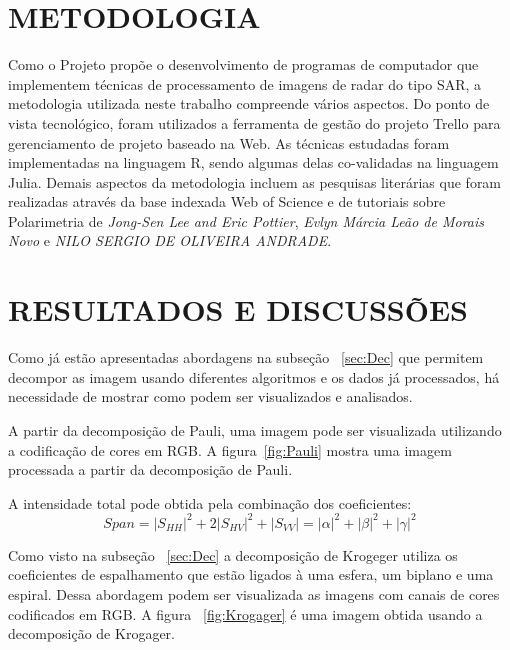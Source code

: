 \documentclass[a4paper,12pt]{article}
\begin{document}

\section{METODOLOGIA}
\label{sec:Met}

Como o Projeto propõe o desenvolvimento de programas de computador que implementem técnicas de processamento de imagens de radar do tipo SAR, a  metodologia utilizada neste trabalho compreende vários aspectos. Do ponto de vista tecnológico, foram utilizados a ferramenta de gestão do projeto Trello para gerenciamento de projeto baseado na Web. As técnicas estudadas foram implementadas na linguagem R, sendo algumas delas co-validadas na linguagem Julia.
Demais aspectos da metodologia incluem as pesquisas literárias que foram realizadas através da base indexada Web of Science e de tutoriais sobre Polarimetria de \emph{Jong-Sen Lee and Eric Pottier}, \emph{Evlyn Márcia Leão de Morais Novo} e \emph{NILO SERGIO DE OLIVEIRA ANDRADE}. 

\newpage
\section{RESULTADOS E DISCUSSÕES}
\label{sec:Result}

Como já estão apresentadas abordagens na subseção ~\ref{sec:Dec} que permitem decompor as imagem usando diferentes algoritmos e os dados já processados, há necessidade de mostrar como podem ser visualizados e analisados.

A partir da decomposição de Pauli, uma imagem pode ser visualizada utilizando a codificação de cores em RGB. A figura~\ref{fig:Pauli} mostra uma imagem processada a partir da decomposição de Pauli.

A intensidade total pode obtida pela combinação dos coeficientes:
\begin{equation}
    Span = |S_{HH}|^2+2|S_{HV}|^2+|S_{VV}|=|\alpha|^2+|\beta|^2+|\gamma|^2
\end{equation}

Como visto na subseção ~\ref{sec:Dec} a decomposição de Krogeger utiliza os coeficientes de espalhamento que estão ligados à uma esfera, um biplano e uma espiral. Dessa abordagem podem ser visualizada as imagens com canais de cores codificados em RGB. A figura ~\ref{fig:Krogager} é uma imagem obtida usando a decomposição de Krogager.
\end{document}
